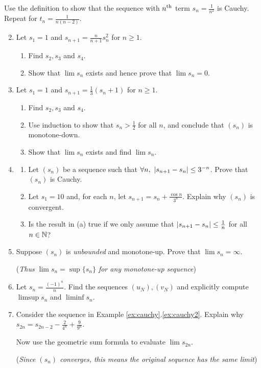 \begin{exercisessec}{}{}
\exstart Use the definition to show that the sequence with $n\textsuperscript{th}$ term $s_n=\frac 1{n^2}$ is Cauchy. Repeat for $t_n=\frac 1{n(n-2)}$.
\begin{enumerate}\setcounter{enumi}{1}
  \item%
  Let $s_1=1$ and $s_{n+1}=\frac n{n+1}s_n^2$ for $n\ge 1$.
  \begin{enumerate}
	  \item Find $s_2, s_3$ and $s_4$.
	  \item Show that $\lim s_n$ exists and hence prove that $\lim s_n=0$.
  \end{enumerate}
  
  
  \item%
  Let $s_1=1$ and $s_{n+1}=\frac 13(s_n+1)$ for $n\ge 1$.
  \begin{enumerate}
	  \item Find $s_2, s_3$ and $s_4$.
	  \item Use induction to show that $s_n>\frac 12$ for all $n$, and conclude that $(s_n)$ is monotone-down.
	  \item Show that $\lim s_n$ exists and find $\lim s_n$.
  \end{enumerate}
  
  
  \item%
  \begin{enumerate}
  	\item Let $(s_n)$ be a sequence such that $\forall n,\ \nm{s_{n+1}-s_n}\le 3^{-n}$. Prove that $(s_n)$ is Cauchy.
  	\item Let $s_1=10$ and, for each $n$, let $s_{n+1}=s_n+\frac{\cos n}{3^n}$. Explain why $(s_n)$ is convergent.
  	\item Is the result in (a) true if we only assume that $\left| s_{n+1}-s_n\right|\le \frac 1n$ for all $n\in\mathbb{N}$?
  \end{enumerate}
  
    
  \item\label{exs:unbddmonotone} Suppose $(s_n)$ is \emph{unbounded} and monotone-up. Prove that $\lim s_n=\infty$.\par
  (\emph{Thus $\lim s_n=\sup\{s_n\}$ for any monotone-up sequence}) 
  

	\item Let $s_n=\frac{(-1)^n}n$. Find the sequences $(u_N),(v_N)$ and explicitly compute $\limsup s_n$ and $\liminf s_n$.
  
  
  \item\label{exs:cauchygeomeval} Consider the sequence in Example \ref*{ex:cauchy}.\ref{ex:cauchy2}. Explain why $s_{2n}=s_{2n-2}-\frac 2{4^n}+\frac 9{9^n}$.\par
  Now use the geometric sum formula to evaluate $\lim s_{2n}$.\par
  (\emph{Since $(s_n)$ converges, this means the original sequence has the same limit})
  

\end{enumerate}
\end{exercisessec}
